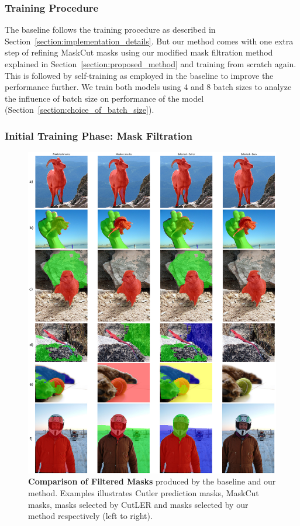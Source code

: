 \subsubsection{Training Procedure}
The baseline follows the training procedure as described in Section~\ref{section:implementation_details}. But our method comes with one extra step of refining MaskCut masks using our modified mask filtration method explained in Section~\ref{section:proposed_method} and training from scratch again. This is followed by self-training as employed in the baseline to improve the performance further. We train both models using 4 and 8 batch sizes to analyze the influence of batch size on performance of the model (Section~\ref{section:choice_of_batch_size}). 

\subsubsection{Initial Training Phase: Mask Filtration}
\begin{figure}
	\centering
	\includegraphics[width=1\textwidth]{Images/main/filtered_mask_comparison.png}
	\caption[\textbf{Mask Filtration Outputs - Baseline vs Ours}]{\textbf{Comparison of Filtered Masks} produced by the baseline and our method. Examples illustrates Cutler prediction masks, MaskCut masks, masks selected by CutLER and masks selected by our method respectively (left to right).}
	\label{fig:filtered_mask_comparison}
\end{figure}
